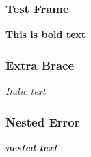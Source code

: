 \documentclass{beamer}
\begin{document}
\begin{frame}
\frametitle{Test Frame}
\textbf{This is bold text}
\end{frame}

\begin{frame}
\frametitle{Extra Brace}
\textit{Italic text}
\end{frame}

\begin{frame}
\frametitle{Nested Error}
\textbf{\textit{nested text}}
\end{frame}
\end{document}
